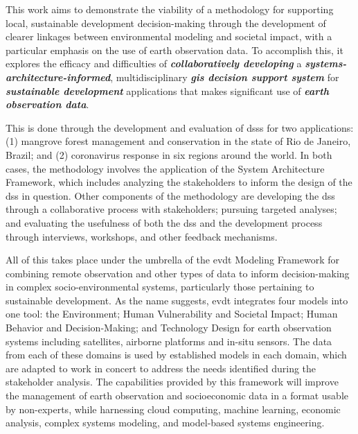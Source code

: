 % 
% 
%
This work aims to demonstrate the viability of a methodology for supporting local, sustainable development decision-making through the development of clearer linkages between environmental modeling and societal impact, with a particular emphasis on the use of earth observation data. To accomplish this, it explores the efficacy and difficulties of \textbf{\textit{collaboratively developing}} a \textbf{\textit{systems-architecture-informed}}, multidisciplinary \textbf{\textit{\acs{gis} decision support system}} for \textbf{\textit{sustainable development}} applications that makes significant use of \textbf{\textit{earth observation data}}. 

This is done through the development and evaluation of \acp{dss} for two applications: (1) mangrove forest management and conservation in the state of Rio de Janeiro, Brazil; and (2) coronavirus response in six regions around the world. In both cases, the methodology involves the application of the System Architecture Framework, which includes analyzing the stakeholders to inform the design of the \ac{dss} in question. Other components of the methodology are developing the \ac{dss} through a collaborative process with stakeholders; pursuing targeted analyses; and evaluating the usefulness of both the \ac{dss} and the development process through interviews, workshops, and other feedback mechanisms.

All of this takes place under the umbrella of the \ac{evdt} Modeling Framework for combining remote observation and other types of data to inform decision-making in complex socio-environmental systems, particularly those pertaining to sustainable development. As the name suggests, \ac{evdt} integrates four models into one tool: the Environment; Human Vulnerability and Societal Impact; Human Behavior and Decision-Making; and Technology Design for earth observation systems including satellites, airborne platforms and in-situ sensors. The data from each of these domains is used by established models in each domain, which are adapted to work in concert to address the needs identified during the stakeholder analysis. The capabilities provided by this framework will improve the management of earth observation and socioeconomic data in a format usable by non-experts, while harnessing cloud computing, machine learning, economic analysis, complex systems modeling, and model-based systems engineering.

